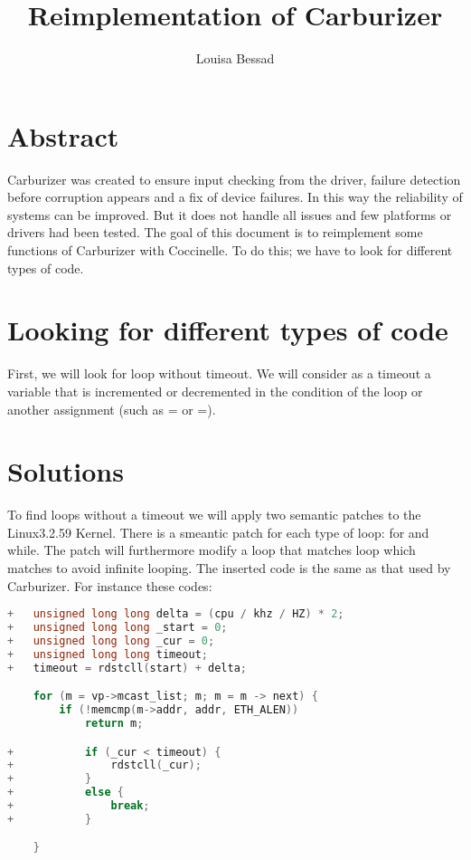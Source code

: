 \documentclass[11pt]{article}
\title{\fontsize{15pt}{10pt}\selectfont\textbf{Reimplementation of Carburizer}}
\author{Louisa Bessad}
\begin{document}
\maketitle

\section{Abstract}
Carburizer was created to ensure input checking from the driver,  failure detection before corruption appears and a fix of device failures. In this way the reliability of systems can be improved. But it does not handle all issues and few platforms or drivers had been tested. The goal of this document is to reimplement some functions of Carburizer with Coccinelle. To do this; we have to look for different types of code.

\section{Looking for different types of code}
First, we will look for loop without timeout. We will consider as a timeout a variable that is incremented or decremented in the condition of the loop or another assignment (such as  \ll= or \gg=). 

\section{Solutions}
To find loops without a timeout we will apply two semantic patches to the Linux3.2.59 Kernel. There is a smeantic patch for each type of loop: for and while. The patch will furthermore modify a loop that matches loop which matches to avoid infinite looping. The inserted code is the same as that used by Carburizer. For instance these codes:

\vspace*{5mm}
\lstset{numbers=left,firstnumber=1,numberfirstline=true}
\begin{lstlisting}[language=C]
+	unsigned long long delta = (cpu / khz / HZ) * 2;
+	unsigned long long _start = 0;
+	unsigned long long _cur = 0;
+	unsigned long long timeout;
+	timeout = rdstcll(start) + delta;

 	for (m = vp->mcast_list; m; m = m -> next) {
 		if (!memcmp(m->addr, addr, ETH_ALEN))
 			return m;

+			if (_cur < timeout) {
+				rdstcll(_cur);
+			}
+			else {
+				break;
+			}

 	}
\end{lstlisting}
\end{document}

